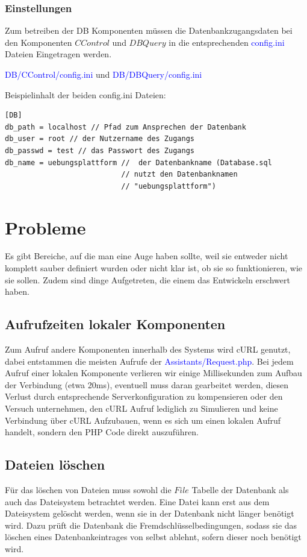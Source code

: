 \documentclass[10pt,a4paper,final,parskip]{scrartcl}
\newcommand{\blau}[1]{\textcolor{blue}{#1}}
\begin{document}
\subsubsection{Einstellungen}
Zum betreiben der DB Komponenten müssen die Datenbankzugangsdaten bei den Komponenten $CControl$ und $DBQuery$ in die entsprechenden \blau{config.ini} Dateien Eingetragen werden.

\blau{DB/CControl/config.ini} und 
\blau{DB/DBQuery/config.ini}

Beispielinhalt der beiden config.ini Dateien:

\begin{minipage}{\textwidth}
\begin{lstlisting}
[DB]
db_path = localhost // Pfad zum Ansprechen der Datenbank
db_user = root // der Nutzername des Zugangs
db_passwd = test // das Passwort des Zugangs
db_name = uebungsplattform //  der Datenbankname (Database.sql 
                           // nutzt den Datenbanknamen
                           // "uebungsplattform")
\end{lstlisting}
\end{minipage}

\section{Probleme}
Es gibt Bereiche, auf die man eine Auge haben sollte, weil sie entweder nicht komplett sauber definiert wurden oder nicht klar ist, ob sie so funktionieren, wie sie sollen. Zudem sind dinge Aufgetreten, die einem das Entwickeln erschwert haben.

\subsection{Aufrufzeiten lokaler Komponenten}
Zum Aufruf andere Komponenten innerhalb des Systems wird cURL genutzt, dabei entstammen die meisten Aufrufe der 
\textcolor{blue}{Assistants/Request.php}. Bei jedem Aufruf einer lokalen Komponente verlieren wir einige Millisekunden zum Aufbau der Verbindung (etwa 20ms), eventuell muss daran gearbeitet werden, diesen Verlust durch entsprechende Serverkonfiguration zu kompensieren oder den Versuch unternehmen, den cURL Aufruf lediglich zu Simulieren und keine Verbindung über cURL Aufzubauen, wenn es sich um einen lokalen Aufruf handelt, sondern den PHP Code direkt auszuführen.

\subsection{Dateien löschen}
Für das löschen von Dateien muss sowohl die $File$ Tabelle der Datenbank als auch das Dateisystem betrachtet werden. Eine Datei kann erst aus dem Dateisystem gelöscht werden, wenn sie in der Datenbank nicht länger benötigt wird. Dazu prüft die Datenbank die Fremdschlüsselbedingungen, sodass sie das löschen eines Datenbankeintrages von selbst ablehnt, sofern dieser noch benötigt wird.
\end{document}
